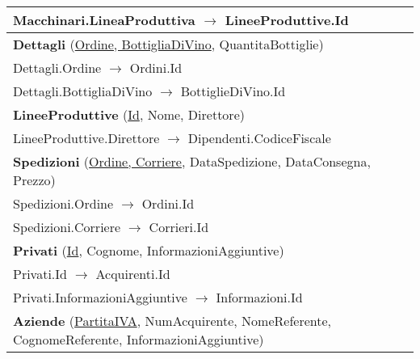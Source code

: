 \begin{center}
\begin{minipage}[t]{7.5cm}
{\begin{tabular}{P{7.5cm}}
				\midrule
				Macchinari.LineaProduttiva $\to$ LineeProduttive.Id                                                                                                \\
				\midrule
				 \textbf{Dettagli} (\underline{Ordine, BottigliaDiVino}, QuantitaBottiglie)                                        \\
				\midrule
				Dettagli.Ordine $\to$ Ordini.Id                                                                                                                    \\
				\midrule
				Dettagli.BottigliaDiVino $\to$ BottiglieDiVino.Id                                                                                                  \\
				\midrule
				 \textbf{LineeProduttive} (\underline{Id}, Nome, Direttore)                                                        \\
				\midrule
				LineeProduttive.Direttore $\to$ Dipendenti.CodiceFiscale                                                                                           \\
				\midrule
				 \textbf{Spedizioni} (\underline{Ordine, Corriere}, DataSpedizione, DataConsegna, Prezzo)                          \\
				\midrule
				Spedizioni.Ordine $\to$ Ordini.Id                                                                                                                  \\
				\midrule
				Spedizioni.Corriere $\to$ Corrieri.Id                                                                                                              \\
				\midrule
				 \textbf{Privati} (\underline{Id}, Cognome, InformazioniAggiuntive)                                                \\
				\midrule
				Privati.Id $\to$ Acquirenti.Id                                                                                                                     \\
				\midrule
				Privati.InformazioniAggiuntive $\to$ Informazioni.Id                                                                                               \\
				\midrule
				 \textbf{Aziende} (\underline{PartitaIVA}, NumAcquirente, NomeReferente, CognomeReferente, InformazioniAggiuntive) \\

\end{tabular}}
\end{minipage}
\end{center}
